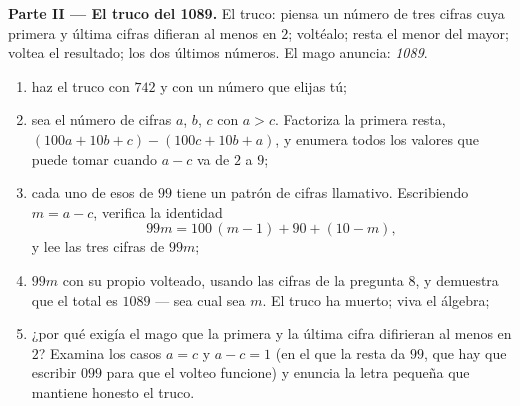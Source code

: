 \begin{problem}
\medskip
\noindent\textbf{Parte II --- El truco del 1089.}
El truco: piensa un número de tres cifras cuya primera y última
cifras difieran al menos en $2$; voltéalo; resta el menor
del mayor; voltea el resultado;  los dos últimos números.
El mago anuncia: \emph{1089}.
\begin{enumerate}[resume]
  \item haz el truco con $742$ y con un número que elijas
        tú;
  \item sea el número de cifras $a$, $b$, $c$ con $a > c$.
        Factoriza la primera resta,
        $(100a + 10b + c) - (100c + 10b + a)$, y enumera todos los
        valores que puede tomar cuando $a - c$ va de $2$ a $9$;
  \item cada uno de esos  de $99$ tiene un patrón de cifras
        llamativo. Escribiendo $m = a - c$, verifica la identidad
        \[
        99m = 100\,(m - 1) + 90 + (10 - m),
        \]
        y lee las tres cifras de $99m$;
  \item {} $99m$ con su propio volteado, usando las cifras de
        la pregunta 8, y demuestra que el total es $1089$ --- sea cual sea
        $m$. El truco ha muerto; viva el álgebra;
  \item ¿por qué exigía el mago que la primera y la última cifra
        difirieran al menos en $2$? Examina los casos $a = c$ y
        $a - c = 1$ (en el que la resta da $99$, que
        hay que escribir $099$ para que el volteo funcione) y
        enuncia la letra pequeña que mantiene honesto el truco.
\end{enumerate}


\end{problem}
